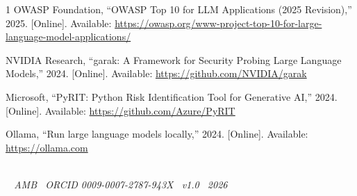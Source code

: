 \documentclass[conference]{IEEEtran}
\begin{document}
\begin{thebibliography}{1}
OWASP Foundation, ``OWASP Top 10 for LLM Applications (2025
Revision),'' 2025. [Online]. Available:
\url{https://owasp.org/www-project-top-10-for-large-language-model-applications/}

NVIDIA Research, ``garak: A Framework for Security Probing Large
Language Models,'' 2024. [Online]. Available:
\url{https://github.com/NVIDIA/garak}

Microsoft, ``PyRIT: Python Risk Identification Tool for Generative
AI,'' 2024. [Online]. Available:
\url{https://github.com/Azure/PyRIT}

Ollama, ``Run large language models locally,'' 2024. [Online].
Available: \url{https://ollama.com}
\end{thebibliography}

\vspace{2mm}
\begin{center}
\\[0.5mm]
{\scriptsize \itshape ~ AMB \textperiodcentered\ ORCID
0009-0007-2787-943X \textperiodcentered\ v1.0 \textperiodcentered\
2026 ~}
\end{center}
\end{document}
